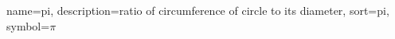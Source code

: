 
{
  name=pi,
  description={ratio of circumference of circle to its diameter},
  sort=pi,
  symbol={\ensuremath{\pi}}
}
